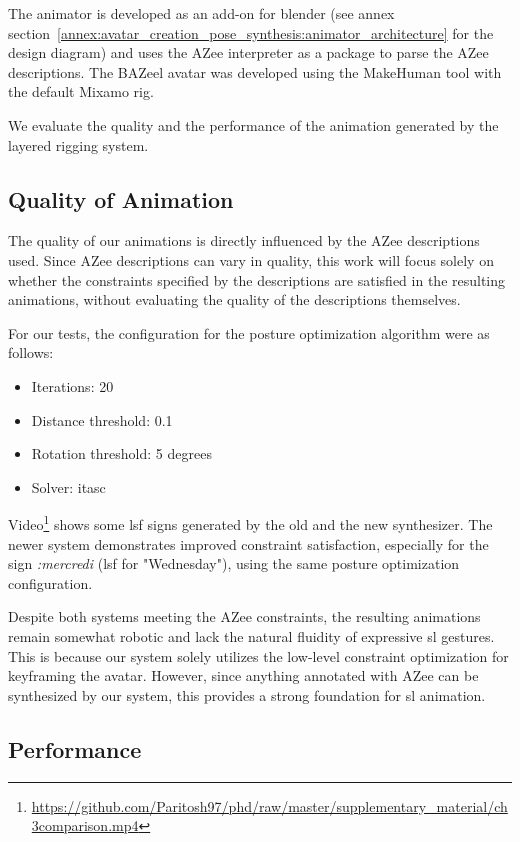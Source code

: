 \documentclass[../../main.tex]{subfiles}
\begin{document}
The animator is developed as an add-on for blender (see annex section~\ref{annex:avatar_creation_pose_synthesis:animator_architecture} for the design diagram) and uses the AZee interpreter as a package to parse the AZee descriptions. The BAZeel avatar was developed using the MakeHuman tool with the default Mixamo rig. 

We evaluate the quality and the performance of the animation generated by the layered rigging system.

\subsection{Quality of Animation}
\label{ch:avatar_creation_pose_synthesis:evaluation:quality}

The quality of our animations is directly influenced by the AZee descriptions used. Since AZee descriptions can vary in quality, this work will focus solely on whether the constraints specified by the descriptions are satisfied in the resulting animations, without evaluating the quality of the descriptions themselves.

For our tests, the configuration for the posture optimization algorithm were as follows:
\begin{itemize}
    \item Iterations: 20
    \item Distance threshold: 0.1
    \item Rotation threshold: 5 degrees
    \item Solver: \gls{itasc}
\end{itemize}

Video\footnote{\url{https://github.com/Paritosh97/phd/raw/master/supplementary_material/ch3comparison.mp4}} shows some \gls{lsf} signs generated by the old and the new synthesizer. The newer system demonstrates improved constraint satisfaction, especially for the sign \emph{:mercredi} (\gls{lsf} for "Wednesday"), using the same posture optimization configuration.

Despite both systems meeting the AZee constraints, the resulting animations remain somewhat robotic and lack the natural fluidity of expressive \gls{sl} gestures. This is because our system solely utilizes the low-level constraint optimization for keyframing the avatar. However, since anything annotated with AZee can be synthesized by our system, this provides a strong foundation for \gls{sl} animation.

\subsection{Performance}
\label{ch:avatar_creation_pose_synthesis:evaluation:performance}
\end{document}
